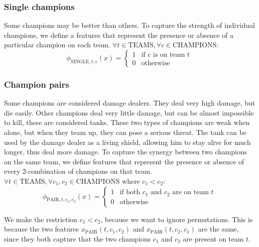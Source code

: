 \subsubsection{Single champions}
Some champions may be better than others. To capture the strength of individual champions, we define a features that represent the presence or absence of a particular champion on each team.
$\forall t \in \text{TEAMS}, \forall c \in \text{CHAMPIONS}:$
\begin{equation}\label{eq:single}  
\phi_{\text{SINGLE}, t, c}(x) = 
\begin{cases} 
  1 & \text{if } c \text{ is on team } t\\
  0 & \text{otherwise} 
\end{cases}
\end{equation}

\subsubsection{Champion pairs}
Some champions are considered damage dealers. They deal very high damage, but die easily. Other champions deal very little damage, but can be almost impossible to kill, these are considered tanks. These two types of champions are weak when alone, but when they team up, they can pose a serious threat. The tank can be used by the damage dealer as a living shield, allowing him to stay alive for much longer, thus deal more damage.
To capture the synergy between two champions on the same team, we define features that represent the presence or absence of every 2-combination of champions on that team. $\forall t \in \text{TEAMS}, \forall c_1, c_2 \in \text{CHAMPIONS}$ where $c_1 < c_2$:
\begin{equation}\label{eq:pair}
\phi_{\text{PAIR}, t, c_1, c_2}(x) =
\begin{cases}
  1 & \text{if both } c_1 \text{ and } c_2 \text{ are on team } t\\
  0 & \text{otherwise}
\end{cases}
\end{equation}

We make the restriction $c_1 < c_2$, because we want to ignore permutations. This is because the two features $x_\text{PAIR}(t, c_1, c_2)$ and $x_\text{PAIR}(t, c_2, c_1)$ are the same, since they both capture that the two champions $c_1$ and $c_2$ are present on team $t$.

